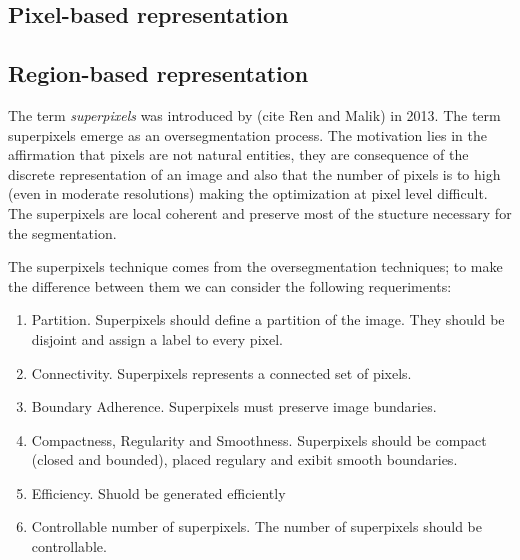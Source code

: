 \begin{definition}[Subgraph]

\end{definition}

\begin{definition}

\end{definition}

\begin{definition}

\end{definition}

\begin{definition}[Adjacency]

\end{definition}

\begin{definition}

\end{definition}



\subsection{Pixel-based representation}


\subsection{Region-based representation}
The term \textit{superpixels} was introduced by (cite Ren and Malik) in 2013. The term superpixels emerge as an oversegmentation process. The motivation lies in the affirmation that pixels are not natural entities, they are consequence of the discrete representation of an image and also that the number of pixels is to high (even in moderate resolutions) making the optimization at pixel level difficult. The superpixels are local coherent and preserve most of the stucture necessary for the segmentation.  

The superpixels technique comes from the oversegmentation techniques; to make the difference between them we can consider the following requeriments:
\begin{enumerate}
 \item Partition. Superpixels should define a partition of the image. They should be disjoint and assign a label to every pixel.
 \item Connectivity. Superpixels represents a connected set of pixels.
 \item Boundary Adherence. Superpixels must preserve image bundaries.
 \item Compactness, Regularity and Smoothness. Superpixels should be compact (closed and bounded), placed regulary and exibit smooth boundaries.
 \item Efficiency. Shuold be generated efficiently
 \item Controllable number of superpixels. The number of superpixels should be controllable.
\end{enumerate}

